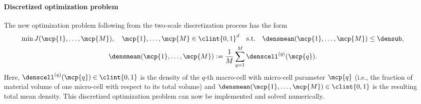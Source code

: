 \paragraph{Discretized optimization problem}

The new optimization problem following from the
two-scale discretization process has the form
\begin{subequations}
  \label{eq:topoOptProblemDiscrete}
  \begin{gather}
    \min J(\mcp{1}, \dotsc, \mcp{M}),\quad
    \mcp{1}, \dotsc, \mcp{M} \in \clint{0, 1}^d
    \quad\text{s.t.}\quad
    \densmean(\mcp{1}, \dotsc, \mcp{M}) \le \densub,\\
    \densmean(\mcp{1}, \dotsc, \mcp{M})
    := \frac{1}{M} \sum_{q=1}^M \denscell^{(q)}(\mcp{q}).
  \end{gather}
\end{subequations}
Here, $\denscell^{(q)}(\mcp{q}) \in \clint{0, 1}$ is the
density of the $q$-th macro-cell with micro-cell parameter $\mcp{q}$
(i.e., the fraction of material volume of one micro-cell
with respect to its total volume)
and $\densmean(\mcp{1}, \dotsc, \mcp{M}) \in \clint{0, 1}$
is the resulting total mean density.
This discretized optimization problem can now be implemented and
solved numerically.
